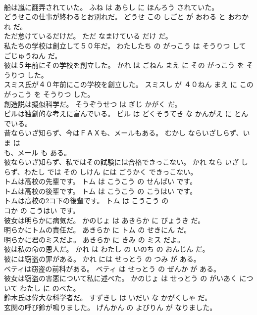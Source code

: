 \documentclass[8pt]{extreport}
\begin{document}
\begin{CJK}{UTF8}{min}
\\	船は嵐に翻弄されていた。	ふね は あらし に ほんろう されていた。	
\\	どうせこの仕事が終わるとお別れだ。	どうせ この しごと が おわる と おわかれ だ。	
\\	ただ怠けているだけだ。	ただ なまけている だけ だ。	
\\	私たちの学校は創立して５０年だ。	わたしたち の がっこう は そうりつ して ごじゅうねん だ。	
\\	彼は５年前にその学校を創立した。	かれ は ごねん まえ に その がっこう を そうりつ した。	
\\	スミス氏が４０年前にこの学校を創立した。	スミスし が ４０ねん まえ に この がっこう を そうりつ した。	
\\	創造説は擬似科学だ。	そうぞうせつ は ぎじ かがく だ。	
\\	ビルは独創的な考えに富んでいる。	ビル は どくそうてき な かんがえ に とんでいる。	
\\	昔ならいざ知らず、今はＦＡＸも、メールもある。	むかし ならいざしらず、いま は 
\\	も、メール も ある。	
\\	彼ならいざ知らず、私ではその試験には合格できっこない。	かれ なら いざ しらず、わたし では その しけん には ごうかく できっこない。	
\\	トムは高校の先輩です。	トム は こうこう の せんぱい です。	
\\	トムは高校の後輩です。	トム は こうこう の こうはい です。	
\\	トムは高校の2コ下の後輩です。	トム は こうこう の 
\\	コか の こうはい です。	
\\	彼女は明らかに病気だ。	かのじょ は あきらか に びょうき だ。	
\\	明らかにトムの責任だ。	あきらか に トム の せきにん だ。	
\\	明らかに君のミスだよ。	あきらか に きみ の ミス だよ。	
\\	彼は私の命の恩人だ。	かれ は わたし の いのち の おんじん だ。	
\\	彼には窃盗の罪がある。	かれ には せっとう の つみ が ある。	
\\	ベティは窃盗の前科がある。	ベティ は せっとう の ぜんか が ある。	
\\	彼女は窃盗の害悪について私に述べた。	かのじょ は せっとう の がいあく について わたし に のべた。	
\\	鈴木氏は偉大な科学者だ。	すずきし は いだい な かがくしゃ だ。	
\\	玄関の呼び鈴が鳴りました。	げんかん の よびりん が なりました。	

\end{CJK}
\end{document}
